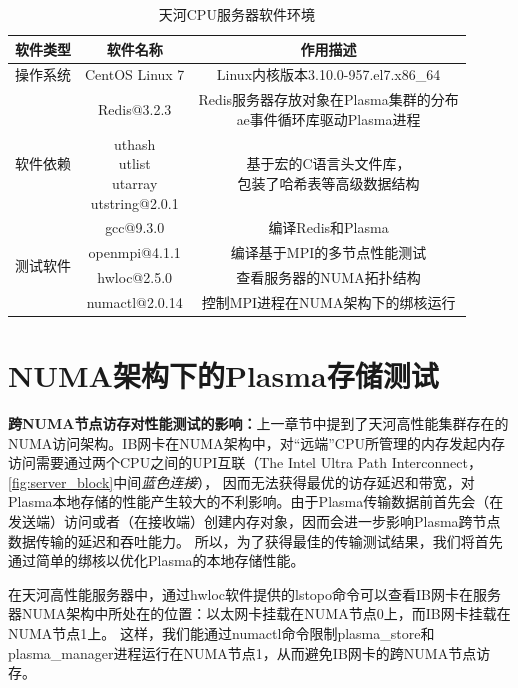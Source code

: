 \begin{table}[h]
    \centering
    \caption{天河CPU服务器软件环境}
    \begin{tabular}{*{3}{c}}
        \toprule
        软件类型 & 软件名称  & 作用描述 \\
        \midrule
        操作系统 & CentOS Linux 7 & Linux内核版本3.10.0-957.el7.x86\_64 \\
        \midrule
        \multirow{3}{*}{软件依赖} & Redis@3.2.3 & \makecell{Redis服务器存放对象在Plasma集群的分布 \\ ae事件循环库驱动Plasma进程} \\
    	 & \makecell{uthash \\ utlist \\ utarray \\ utstring}@2.0.1 & \makecell{基于宏的C语言头文件库，\\ 包装了哈希表等高级数据结构} \\
		 & gcc@9.3.0 & 编译Redis和Plasma \\
        \midrule
    	\multirow{2}{*}{测试软件} & openmpi@4.1.1 & 编译基于MPI的多节点性能测试 \\
		& hwloc@2.5.0 & 查看服务器的NUMA拓扑结构 \\
		& numactl@2.0.14 & 控制MPI进程在NUMA架构下的绑核运行 \\
        \bottomrule
    \end{tabular}
    \label{tab:software_config}
\end{table}

\section{NUMA架构下的Plasma存储测试}

\textbf{跨NUMA节点访存对性能测试的影响：}上一章节中提到了天河高性能集群存在的NUMA访问架构。IB网卡在NUMA架构中，对“远端”CPU所管理的内存发起内存访问需要通过两个CPU之间的UPI互联（The Intel Ultra Path Interconnect，\autoref{fig:server_block}中间\textit{蓝色连接}），
因而无法获得最优的访存延迟和带宽，对Plasma本地存储的性能产生较大的不利影响。由于Plasma传输数据前首先会（在发送端）访问或者（在接收端）创建内存对象，因而会进一步影响Plasma跨节点数据传输的延迟和吞吐能力。
所以，为了获得最佳的传输测试结果，我们将首先通过简单的绑核以优化Plasma的本地存储性能。

在天河高性能服务器中，通过hwloc软件提供的lstopo命令可以查看IB网卡在服务器NUMA架构中所处在的位置：以太网卡挂载在NUMA节点0上，而IB网卡挂载在NUMA节点1上。
这样，我们能通过numactl命令限制plasma\_store和plasma\_manager进程运行在NUMA节点1，从而避免IB网卡的跨NUMA节点访存。


